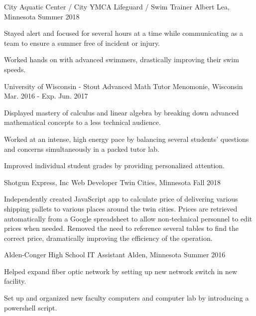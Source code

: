 \begin{cventries}
  \cventry
    {City Aquatic Center / City YMCA} %
    {Lifeguard / Swim Trainer} %
    {Albert Lea, Minnesota} %
    {Summer 2018} %
    {
      \begin{cvitems} %
        \item {Stayed alert and focused for several hours at a time while communicating as a team to ensure a summer free of incident or injury.}
        \item {Worked hands on with advanced swimmers, drastically improving their swim speeds.}
      \end{cvitems}
    }

  \cventry
    {University of Wisconsin - Stout} %
    {Advanced Math Tutor} %
    {Menomonie, Wisconsin} %
    {Mar. 2016 - Exp. Jun. 2017} %
    {
      \begin{cvitems} %
        \item {Displayed mastery of calculus and linear algebra by breaking down advanced mathematical concepts to a less technical audience.}
        \item {Worked at an intense, high energy pace by balancing several students’ questions and concerns simultaneously in a packed tutor lab.}
        \item {Improved individual student grades by providing personalized attention.}
      \end{cvitems}
    }

  \cventry
    {Shotgun Express, Inc}
    {Web Developer}
    {Twin Cities, Minnesota} %
    {Fall 2018} %
    {
      \begin{cvitems} %
        \item {Independently created JavaScript app to calculate price of delivering various shipping pallets to various places around the twin cities. Prices are retrieved automatically from a Google spreadsheet to allow non-technical personnel to edit prices when needed. Removed the need to reference several tables to find the correct price, dramatically improving the efficiency of the operation.}
      \end{cvitems}
    }

  \cventry
    {Alden-Conger High School} %
    {IT Assistant} %
    {Alden, Minnesota} %
    {Summer 2016} %
    {
      \begin{cvitems} %
        \item {Helped expand fiber optic network by setting up new network switch in new facility.}
        \item {Set up and organized new faculty computers and computer lab by introducing a powershell script.}
      \end{cvitems}
    }


\end{cventries}
